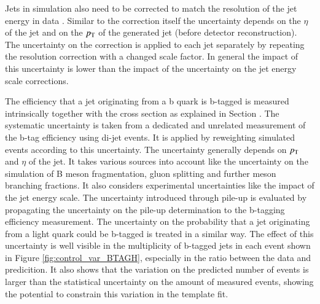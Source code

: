 Jets in simulation also need to be corrected to match the resolution of the jet energy in data . Similar to the correction itself the uncertainty depends on the $\eta$ of the jet and on
the $p_{\mathrm{T}}$ of the generated jet (before detector reconstruction). 
The uncertainty on the correction is applied to each jet separately by repeating the resolution correction with a changed scale factor. In general the impact of this uncertainty is lower than the impact 
of the uncertainty on the jet energy scale corrections.

The efficiency that a jet originating from a b quark is b-tagged is measured intrinsically together with the \ttbar cross section as explained in Section . The systematic uncertainty is taken from a dedicated and unrelated measurement of the b-tag efficiency  using di-jet events. It is applied by reweighting simulated events according to this uncertainty. The uncertainty generally depends on $p_{\mathrm{T}}$ and $\eta$ of the jet.
It takes various sources into account like the uncertainty on the simulation of B meson fragmentation, gluon splitting and further meson branching fractions.
It also considers experimental uncertainties like the impact of the jet energy scale. The uncertainty introduced through pile-up is evaluated by propagating the uncertainty
on the pile-up determination to the b-tagging efficiency measurement.
The uncertainty on the probability that a jet originating from a light quark could be b-tagged is treated in a similar way.
The effect of this uncertainty is well visible in the multiplicity of b-tagged jets in each event shown in Figure \ref{fig:control_var_BTAGH}, especially in the ratio between the data and predicition.
It also shows that the variation on the predicted number of events is larger than the statistical uncertainty on the amount of measured events, showing the potential to constrain this variation in the
template fit.

